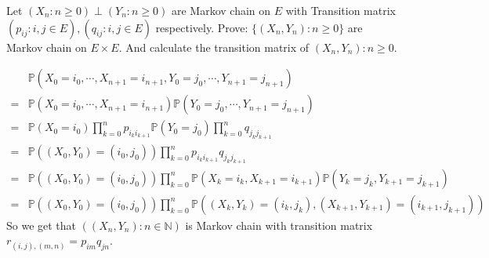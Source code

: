 \documentclass{ctexart}
\newif\ifpreface
\begin{document}
\large
\setlength{\baselineskip}{1.2em}
\ifpreface
  
\else
\fi
{}
\allowdisplaybreaks[4]
\begin{problem}\label{pro:1}
  Let \((X_n:n \geq 0)\perp (Y_n: n \geq 0)\) are Markov chain on \(E\) with
  Transition matrix \((p_{ij}:i,j \in E),(q_{ij}:i,j \in E)\) respectively.
  Prove: \(\{(X_n,Y_n):n \geq 0\}\) are Markov chain on \(E \times E\).
  And calculate the transition matrix of \((X_n,Y_n):n \geq 0\).
\end{problem}
\begin{solution}
  \[
    \begin{aligned}
       & \mathbb{P}(X_0=i_0,\cdots,X_{n+1} =i_{n+1},Y_0=j_0,\cdots,Y_{n+1}=j_{n+1})
      \\= & \mathbb{P}(X_0=i_0,\cdots,X_{n+1} =i_{n+1})\mathbb{P}(Y_0=j_0,\cdots,Y_{n+1}=j_{n+1})
      \\= & \mathbb{P}(X_0=i_0)\prod_{k=0}^{n} p_{i_k i_{k+1} } \mathbb{P}(Y_0=j_0) \prod_{k=0}^{n} q_{j_k j_{k+1}}
      \\= & \mathbb{P}((X_0,Y_0)=(i_0,j_0)) \prod_{k=0}^{n} p_{i_k i_{k+1} } q_{j_k j_{k+1}}
      \\= & \mathbb{P}((X_0,Y_0)=(i_0,j_0)) \prod_{k=0}^{n} \mathbb{P}(X_k = i_k,X_{k + 1}=i_{k + 1})\mathbb{P}(Y_k=j_k,Y_{k + 1}=j_{k + 1})
      \\=& \mathbb{P}((X_0,Y_0)=(i_0,j_0)) \prod_{k=0}^{n} \mathbb{P}((X_k,Y_{k})=(i_k,j_{k}),(X_{k + 1},Y_{k + 1})=(i_{k + 1},j_{k + 1}))
    \end{aligned}
  \]
  So we get that \(\left((X_n,Y_n): n \in \mathbb{N}\right)\) is Markov chain with transition matrix
  \(r_{(i,j),(m,n)}=p_{im}q_{jn}\).
\end{solution}
\end{document}
